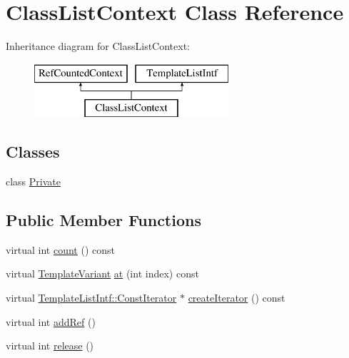 \hypertarget{class_class_list_context}{}\section{Class\+List\+Context Class Reference}
\label{class_class_list_context}
Inheritance diagram for Class\+List\+Context\+:\begin{figure}[H]
\begin{center}
\leavevmode
\includegraphics[height=2.000000cm]{class_class_list_context}
\end{center}
\end{figure}
\subsection*{Classes}
\begin{DoxyCompactItemize}
\item 
class \mbox{\hyperlink{class_class_list_context_1_1_private}{Private}}
\end{DoxyCompactItemize}
\subsection*{Public Member Functions}
\begin{DoxyCompactItemize}
\item 
virtual int \mbox{\hyperlink{class_class_list_context_ae97680a967f4f41b3eaa8bedbc42eddb}{count}} () const
\item 
virtual \mbox{\hyperlink{class_template_variant}{Template\+Variant}} \mbox{\hyperlink{class_class_list_context_a2ff974cf1cd295c866035d255bbb8b36}{at}} (int index) const
\item 
virtual \mbox{\hyperlink{class_template_list_intf_1_1_const_iterator}{Template\+List\+Intf\+::\+Const\+Iterator}} $\ast$ \mbox{\hyperlink{class_class_list_context_acd2dd86b8a6463da6d360c87854cc512}{create\+Iterator}} () const
\item 
virtual int \mbox{\hyperlink{class_class_list_context_a0eff9811a77d47277e1386394c374151}{add\+Ref}} ()
\item 
virtual int \mbox{\hyperlink{class_class_list_context_a4e60c2feddfa7d51bdebf0e412266b91}{release}} ()
\end{DoxyCompactItemize}
